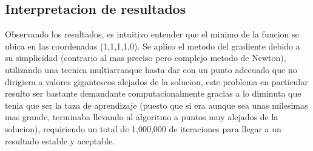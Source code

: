 \documentclass{report}
\begin{document}
            \subsection{Interpretacion de resultados}
                Observando los resultados, es intuitivo entender que el minimo de la funcion se ubica en las coordenadas (1,1,1,1,0).
                Se aplico el metodo del gradiente debido a su simplicidad (contrario al mas preciso pero complejo metodo de Newton),
                utilizando una tecnica multiarranque hasta dar con un punto adecuado que no dirigiera a valores gigantescos alejados de la solucion,
                este problema en particular resulto ser bastante demandante computacionalmente gracias a lo diminuta
                que tenia que ser la taza de aprendizaje (puesto que si era aunque sea unas milesimas mas grande, terminaba llevando al algoritmo a puntos muy alejados de la solucion),
                requiriendo un total de 1,000,000 de iteraciones para llegar a un resultado estable y aceptable.
        \pagebreak
        
\end{document}
